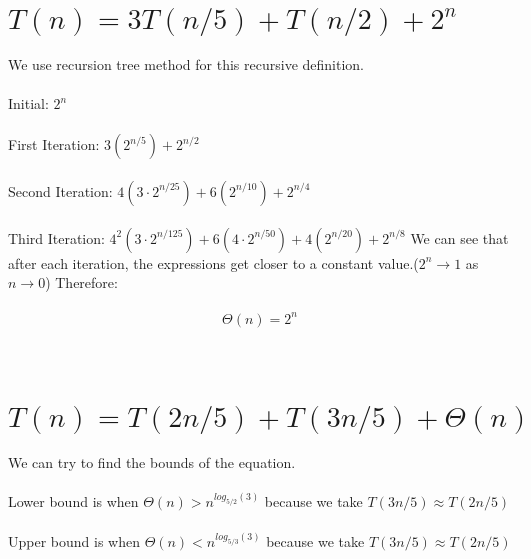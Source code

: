 \documentclass{article}
\begin{document}
\section{$T(n) = 3T(n/5) + T(n/2) + 2^n$}
We use recursion tree method for this recursive definition.\\\\
Initial: $2^n$\\\\
First Iteration: $3(2^{n/5}) + 2^{n/2}$\\\\
Second Iteration: $4(3 \cdot 2^{n/25}) + 6(2^{n/10}) + 2^{n/4}$\\\\
Third Iteration: $4^2(3 \cdot 2^{n/125}) + 6(4 \cdot 2^{n/50}) + 4(2^{n/20}) + 2^{n/8}$
We can see that after each iteration, the expressions get closer to a constant value.($2^n \rightarrow 1$ as $n\rightarrow 0$)
Therefore:\\\\
$$\Theta(n) = 2^{n}$$\\\\

\section{$T(n) = T(2n/5) + T(3n/5) + \Theta(n)$}
We can try to find the bounds of the equation.\\\\
Lower bound is when $\Theta(n) > n^{log_{5/2}(3)} $ because we take $T(3n/5) \approx T(2n/5)$\\\\
Upper bound is when $\Theta(n) < n^{log_{5/3}(3)} $ because we take $T(3n/5) \approx T(2n/5)$\\\\
\end{document}
